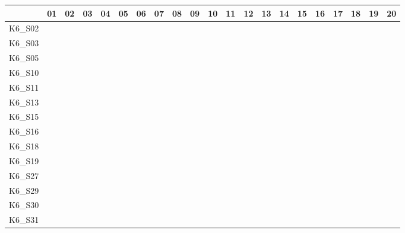 \begin{table}
    \setlength{\tabcolsep}{0.2em}
    \tiny
    \centering
    \begin{tabular}{l|rrrrrrrrrrrrrrrrrrrr}
        \toprule
               & 01 & 02 & 03 & 04 & 05 & 06 & 07 & 08 & 09 & 10 & 11 & 12 & 13 & 14 & 15 & 16 & 17 & 18 & 19 & 20 \\
        \midrule
        K6\_S02 & \y & \y & \y & \y & \y & \y & \y & \y & \y & \y & \y & \y & \y & \y & \y & \x & \x & \y & \y & \y \\
        K6\_S03 & \y & \y & \y & \y & \y & \y & \y & \y & \y & \y & \y & \y & \y & \y & \x & \y & \y & \y & \y & \y \\
        K6\_S05 & \y & \y & \y & \y & \y & \y & \y & \y & \y & \y & \y & \x & \y & \y & \y & \y & \y & \y & \y & \y \\
        K6\_S10 & \y & \y & \y & \y & \y & \y & \y & \y & \y & \y & \y & \y & \y & \y & \y & \x & \y & \y & \x & \x \\
        K6\_S11 & \y & \y & \y & \y & \y & \y & \y & \y & \y & \y & \y & \y & \y & \y & \y & \y & \y & \y & \y & \y \\
        K6\_S13 & \y & \y & \y & \y & \y & \y & \y & \y & \y & \y & \y & \y & \y & \y & \y & \y & \y & \y & \y & \y \\
        K6\_S15 & \y & \y & \y & \y & \y & \y & \y & \y & \y & \y & \y & \y & \y & \y & \y & \y & \y & \y & \y & \y \\
        K6\_S16 & \y & \y & \y & \y & \y & \y & \y & \y & \y & \y & \y & \y & \y & \y & \y & \y & \y & \y & \y & \y \\
        K6\_S18 & \y & \y & \y & \y & \y & \y & \y & \y & \y & \y & \y & \y & \y & \y & \y & \y & \y & \y & \y & \y \\
        K6\_S19 & \y & \y & \y & \y & \y & \y & \y & \y & \y & \y & \y & \y & \y & \y & \y & \y & \y & \y & \x & \y \\
        K6\_S27 & \y & \y & \y & \y & \y & \y & \y & \y & \y & \y & \y & \y & \y & \y & \y & \y & \y & \y & \y & \y \\
        K6\_S29 & \y & \y & \y & \y & \y & \y & \y & \y & \y & \y & \y & \y & \y & \y & \y & \y & \y & \y & \y & \y \\
        K6\_S30 & \y & \y & \y & \y & \y & \y & \y & \y & \y & \y & \y & \y & \x & \x & \y & \y & \y & \y & \y & \y \\
        K6\_S31 & \y & \y & \y & \y & \y & \y & \y & \y & \y & \y & \y & \y & \y & \y & \y & \y & \y & \y & \y & \y \\

\end{tabular}
\end{table}
